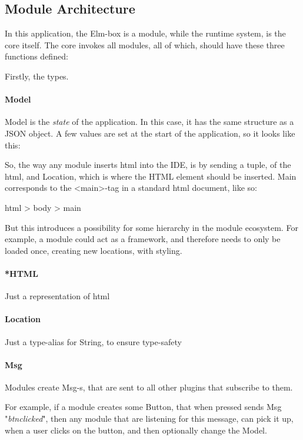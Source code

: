 
\subsection{Module Architecture}

In this application, the Elm-box is a module, while the runtime system, is the
core itself. The core invokes all modules, all of which, should have these three
functions defined:


\begin{center}
  
\end{center}

Firstly, the types.

\paragraph{Model}
Model is the \textit{state} of the application. In this case, it has the same
structure as a JSON object. A few values are set at the start of the
application, so it looks like this:


So, the way any module inserts \gls{html} into the IDE, is by sending a tuple,
of the \gls{html}, and Location, which is where the HTML element should be
inserted. Main corresponds to the <main>-tag in a standard \gls{html} document,
like so:

html > body > main

But this introduces a possibility for some hierarchy in the module ecosystem.
For example, a module could act as a framework, and therefore needs to only be
loaded once, creating new locations, with styling.


\paragraph{*HTML}
Just a representation of \gls{html}


\paragraph{Location}
Just a type-alias for String, to ensure type-safety


\paragraph{Msg}
Modules create Msg-s, that are sent to all other plugins that subscribe to them.

For example, if a module creates some Button, that when pressed sends
Msg "\textit{btn\-clicked}", then any module that are listening for this message,
can pick it up, when a user clicks on the button, and then optionally change the
Model.
